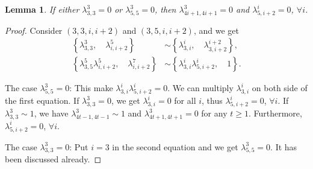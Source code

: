 \documentclass{article}
\newtheorem{lemma}{Lemma}[section]
\begin{document}
\begin{lemma}
If either $\lambda_{3,3}^3=0$ or $\lambda_{5,5}^3=0$,
then $\lambda_{4i+1,4i+1}^3=0$ and $\lambda_{5,i+2}^i=0$, $\forall i$.
\end{lemma}
\begin{proof}
Consider $(3,3,i,i+2)$ and $(3,5,i,i+2)$,
and we get 
\begin{equation}\label{(3,3,i,i+2)}
\begin{aligned}
	\left\{
\lambda_{3,3}^3,\quad\lambda_{i,i+2}^{5}\right\}&\sim
\left\{\lambda_{3,i}^{i},\quad
\lambda_{3,i+2}^{i+2}\right\},\\
\left\{\lambda_{3,5}^5\lambda_{i,i+2}^{5},\quad
\lambda_{i,i+2}^{7}\right\}
&\sim
\left\{\lambda_{3,i}^{i}\lambda_{5,i+2}^{i},\quad
1\right\}.
\end{aligned}
\end{equation}



The case $\lambda_{5,5}^3=0$:
This make
$\lambda_{3,i}^{i}\lambda_{5,i+2}^{i}=0$.
We can multiply $\lambda_{3,i}^i$ on both side of the first equation.
If $\lambda_{3,3}^3=0$, 
we get $\lambda_{3,i}^{i}=0$ for all $i$,
thus $\lambda_{5,i+2}^i=0$, $\forall i$.
If $\lambda_{3,3}^3\sim 1$, 
we have $\lambda_{4t-1,4t-1}^3\sim 1$ and $\lambda_{4t+1,4t+1}^3=0$
for any $t\geq 1$.
Furthermore, $\lambda_{5,i+2}^i=0$, $\forall i$.

The case $\lambda_{3,3}^3=0$:
Put $i=3$ in the second equation and we get $\lambda_{5,5}^3=0$.
It has been discussed already.
\end{proof}


\end{document}

